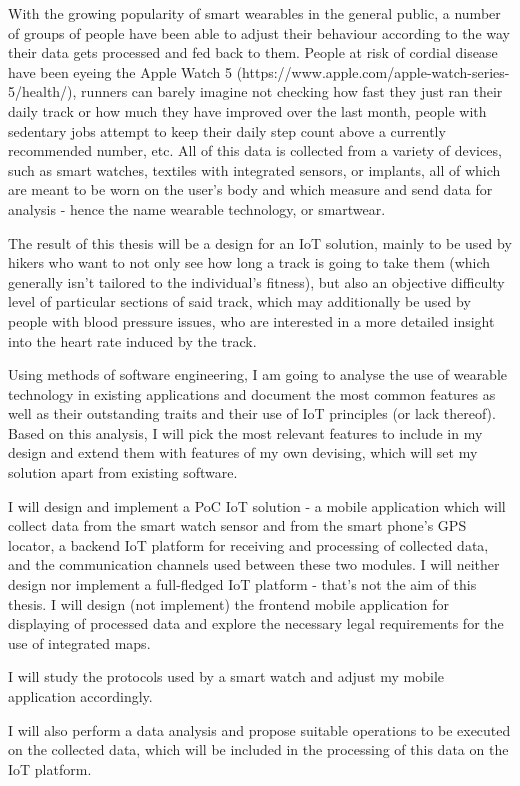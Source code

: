 \linebreak
With the growing popularity of smart wearables in the general public, a number of groups of people have been able to adjust their behaviour according to the way their data gets processed and fed back to them.
People at risk of cordial disease  have been eyeing the Apple Watch 5 (https://www.apple.com/apple-watch-series-5/health/), runners can barely imagine not checking how fast they just ran their daily track or how much they have improved over the last month, people with sedentary jobs attempt to keep their daily step count above a currently recommended number, etc.
All of this data is collected from a variety of devices, such as smart watches, textiles with integrated sensors, or implants, all of which are meant to be worn on the user's body and which measure and send data for analysis - hence the name wearable technology, or smartwear.

The result of this thesis will be a design for an IoT solution, mainly to be used by hikers  who want to not only see how long a track is going to take them (which generally isn't tailored to the individual's fitness),
but also an objective difficulty level of particular sections of said track, which may additionally be used by people with blood pressure issues, who are interested in a more detailed insight into the heart rate induced by the track.

Using methods of software engineering, I am going to analyse the use of wearable technology in existing applications and document the most common features as well as their outstanding traits and their use of IoT principles (or lack thereof).
Based on this analysis, I will pick the most relevant features to include in my design and extend them with features of my own devising, which will set my solution apart from existing software.

I will design and implement a PoC IoT solution - a mobile application which will collect data from the smart watch sensor and from the smart phone's GPS locator, a backend IoT platform for receiving and processing of collected data, and the communication channels used between these two modules.
I will neither design nor implement a full-fledged IoT platform - that's not the aim of this thesis.
I will design (not implement) the frontend mobile application for displaying of processed data and explore the necessary legal requirements for the use of integrated maps.

I will study the protocols used by a smart watch  and adjust my mobile application accordingly.

I will also perform a data analysis and propose suitable operations to be executed on the collected data, which will be included in the processing of this data on the IoT platform.


